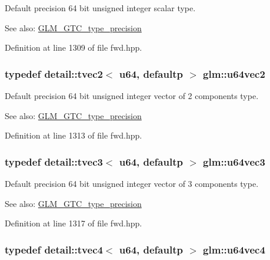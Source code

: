 Default precision 64 bit unsigned integer scalar type. \begin{Desc}
\item[See also:]\hyperlink{group__gtc__type__precision}{GLM\_\-GTC\_\-type\_\-precision} \end{Desc}


Definition at line 1309 of file fwd.hpp.\hypertarget{group__gtc__type__precision_gffa78d655fd98b33e47043e2bd38641b}{
\subsubsection[u64vec2]{\setlength{\rightskip}{0pt plus 5cm}typedef detail::tvec2$<$ u64, defaultp $>$ {\bf glm::u64vec2}}}
\label{group__gtc__type__precision_gffa78d655fd98b33e47043e2bd38641b}


Default precision 64 bit unsigned integer vector of 2 components type. \begin{Desc}
\item[See also:]\hyperlink{group__gtc__type__precision}{GLM\_\-GTC\_\-type\_\-precision} \end{Desc}


Definition at line 1313 of file fwd.hpp.\hypertarget{group__gtc__type__precision_ge934e74663d832989066cc852560866d}{
\subsubsection[u64vec3]{\setlength{\rightskip}{0pt plus 5cm}typedef detail::tvec3$<$ u64, defaultp $>$ {\bf glm::u64vec3}}}
\label{group__gtc__type__precision_ge934e74663d832989066cc852560866d}


Default precision 64 bit unsigned integer vector of 3 components type. \begin{Desc}
\item[See also:]\hyperlink{group__gtc__type__precision}{GLM\_\-GTC\_\-type\_\-precision} \end{Desc}


Definition at line 1317 of file fwd.hpp.\hypertarget{group__gtc__type__precision_g59d78a1ff6d275bbb425dce92f607b9c}{
\subsubsection[u64vec4]{\setlength{\rightskip}{0pt plus 5cm}typedef detail::tvec4$<$ u64, defaultp $>$ {\bf glm::u64vec4}}}
\label{group__gtc__type__precision_g59d78a1ff6d275bbb425dce92f607b9c}


